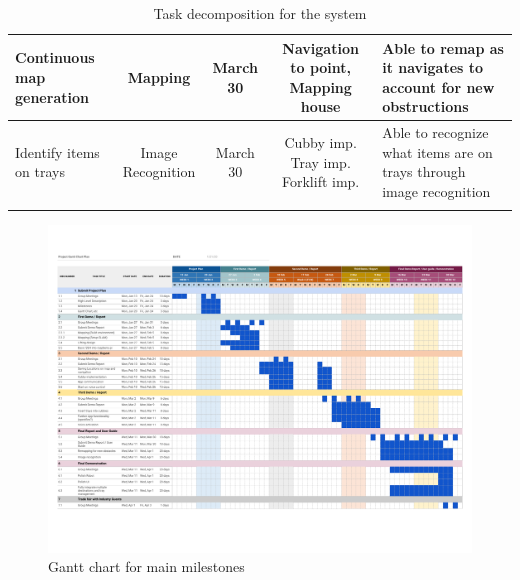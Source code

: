 \documentclass{article}
\begin{document}
\begin{table}[h]
\begin{center}
\begin{small}
\begin{sc}
\begin{tabular}{lcccp{3cm}}
Continuous map generation & Mapping & March 30 & Navigation to point, Mapping house & Able to remap as it navigates to account for new obstructions \\ \hline
Identify items on trays & Image Recognition & March 30 & Cubby imp. Tray imp. Forklift imp. & Able to recognize what items are on trays through image recognition \\ \hline
\belowspace
\end{tabular}
\end{sc}
\end{small}
\caption{Task decomposition for the system}
\label{tab:sample-table}
\end{center}
\vskip -3mm
\end{table}

\begin{figure}
\vskip 3mm
\begin{center}
\begin{small}
\begin{sc}
\centerline{\includegraphics[width=\paperwidth]{figs/Gantt.pdf}}
\caption{Gantt chart for main milestones}
\label{Gantt Chart}
\end{sc}
\end{small}
\end{center}
\vskip -3mm
\end{figure} 
\end{document}
